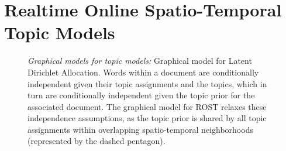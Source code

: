 \section{Realtime Online Spatio-Temporal Topic Models}
\begin{figure}
\begin{center}

 \hfill
{}
\end{center}

\caption{
	\emph{Graphical models for topic models:}
	\protect{} Graphical model for Latent Dirichlet Allocation. Words within a document are conditionally independent given their topic assignments and the topics, which in turn are conditionally independent given the topic prior for the associated document.
	\protect{} The graphical model for ROST relaxes these independence assumptions, as the topic prior is shared by all topic assignments within overlapping spatio-temporal neighborhoods (represented by the dashed pentagon).
}
\label{fig:pgms}
\end{figure}

